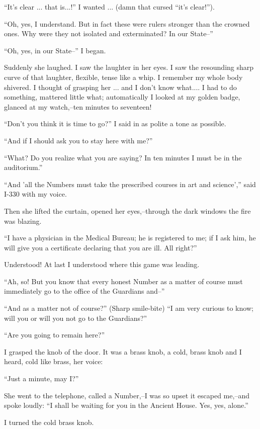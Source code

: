 \documentclass[11pt,openany]{book}
\begin{document}
``It's clear ... that is...!'' I wanted ... (damn that cursed ``it's clear!'').

``Oh, yes, I understand. But in fact these were rulers stronger than the crowned ones. Why were they not isolated and exterminated? In our State--''

``Oh, yes, in our State--'' I began.

Suddenly she laughed. I saw the laughter in her eyes. I saw the resounding sharp curve of that laughter, flexible, tense like a whip. I remember my whole body shivered. I thought of grasping her ... and I don't know what.... I had to do something, mattered little what; automatically I looked at my golden badge, glanced at my watch,--ten minutes to seventeen!

``Don't you think it is time to go?'' I said in as polite a tone as possible.

``And if I should ask you to stay here with me?''

``What? Do you realize what you are saying? In ten minutes I must be in the auditorium.''

``And 'all the Numbers must take the prescribed courses in art and science','' said I-330 with my voice.

Then she lifted the curtain, opened her eyes,--through the dark windows the fire was blazing.

``I have a physician in the Medical Bureau; he is registered to me; if I ask him, he will give you a certificate declaring that you are ill. All right?''

Understood! At last I understood where this game was leading.

``Ah, so! But you know that every honest Number as a matter of course must immediately go to the office of the Guardians and--''

``And as a matter not of course?'' (Sharp smile-bite) ``I am very curious to know; will you or will you not go to the Guardians?''

``Are you going to remain here?''

I grasped the knob of the door. It was a brass knob, a cold, brass knob and I heard, cold like brass, her voice:

``Just a minute, may I?''

She went to the telephone, called a Number,--I was so upset it escaped me,--and spoke loudly: ``I shall be waiting for you in the Ancient House. Yes, yes, alone.''

I turned the cold brass knob.
\end{document}
